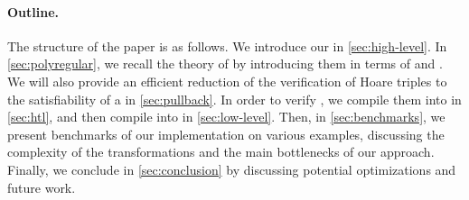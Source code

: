 \hline

\paragraph{Outline.} The structure of the paper is as follows. We introduce our
 in \cref{sec:high-level}. In \cref{sec:polyregular},
we recall the theory of  by introducing them in terms
of  and . We will also
provide an efficient reduction of the verification of Hoare triples to the
satisfiability of a  in \cref{sec:pullback}.
In order to verify , we compile them into  in \cref{sec:htl}, and then compile  into
 in \cref{sec:low-level}. 
%
Then, in \cref{sec:benchmarks}, we present
benchmarks of our implementation on various examples, discussing
the complexity of the transformations and the main bottlenecks of our approach.
Finally, we conclude in \cref{sec:conclusion} by discussing potential
optimizations and future work.

